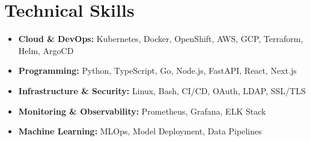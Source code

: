 \documentclass[a4paper,10pt]{article}
\begin{document}
\section*{ Technical Skills}
\begin{itemize}[left=0pt, label=]
    \item \textbf{Cloud \& DevOps:} Kubernetes, Docker, OpenShift, AWS, GCP, Terraform, Helm, ArgoCD
\end{itemize}
\begin{itemize}[left=0pt, label=]
    \item \textbf{Programming:} Python, TypeScript, Go, Node.js, FastAPI, React, Next.js
\end{itemize}
\begin{itemize}[left=0pt, label=]
    \item \textbf{Infrastructure \& Security:} Linux, Bash, CI/CD, OAuth, LDAP, SSL/TLS
\end{itemize}
\begin{itemize}[left=0pt, label=]
    \item \textbf{Monitoring \& Observability:} Prometheus, Grafana, ELK Stack
\end{itemize}
\begin{itemize}[left=0pt, label=]
    \item \textbf{Machine Learning:} MLOps, Model Deployment, Data Pipelines
\end{itemize}

\vspace{2pt}



\end{document}
